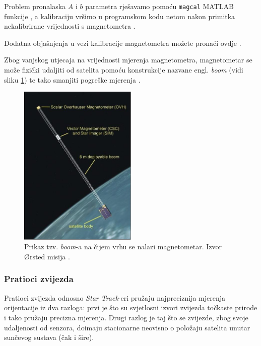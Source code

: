 \documentclass[times, utf8, diplomski, numeric]{templates/template}
\begin{document}
{{{{                Problem pronalaska $A$ i $b$ parametra rješavamo pomoću \texttt{magcal} MATLAB funkcije \cite{magcal}, a kalibraciju vršimo u programskom kodu netom nakon primitka nekalibrirane vrijednosti s magnetometra \cite{kalibracijaMagKod}.

                Dodatna objašnjenja u vezi kalibracije magnetometra možete pronaći ovdje \cite{kalibracijaMatlabStranica}.

                Zbog vanjskog utjecaja na vrijednosti mjerenja magnetometra, magnetometar se može fizički udaljiti od satelita pomoću konstrukcije nazvane engl. \emph{boom} (vidi sliku \ref{fig:boom}) te tako smanjiti pogreške mjerenja \cite{adcsKnjiga}. 

                \begin{figure}[htb]
                \centering
                \includegraphics[width=0.5\textwidth]{images/boom.jpg}
                \caption{Prikaz tzv. \emph{boom}-a na čijem vrhu se nalazi magnetometar. Izvor Ørsted misija \cite{boomCite}.}
                \label{fig:boom}
                \end{figure}
            }

            \subsubsection{Pratioci zvijezda }{
                Pratioci zvijezda odnosno \emph{Star Track}-eri pružaju najpreciznija mjerenja orijentacije iz dva razloga: prvi je što su svjetlosni izvori zvijezda točkaste prirode i tako pružaju precizna mjerenja. Drugi razlog je taj što se zvijezde, zbog svoje udaljenosti od senzora, doimaju stacionarne neovisno o položaju satelita unutar sunčevog sustava (čak i šire).

}}}}
\end{document}
